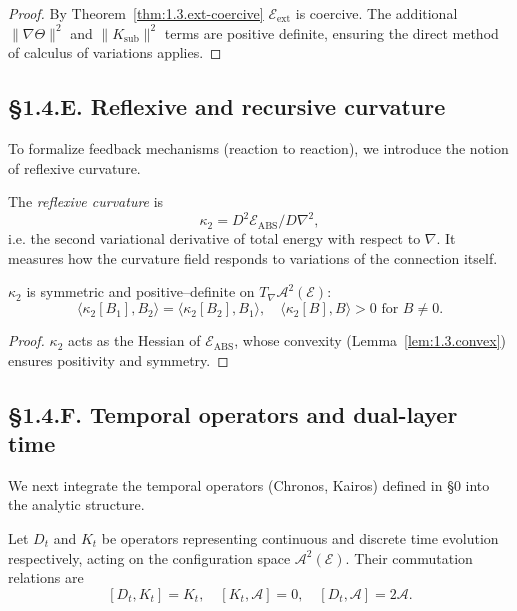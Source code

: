 \begin{proof}
By Theorem~\ref{thm:1.3.ext-coercive} $\mathcal E_{\mathrm{ext}}$ is coercive.  
The additional $\|\nabla\Theta\|^2$ and $\|K_{\mathrm{sub}}\|^2$ terms are positive definite, ensuring the direct method of calculus of variations applies.
\end{proof}

\subsection*{§1.4.E. Reflexive and recursive curvature}

To formalize feedback mechanisms (reaction to reaction), we introduce the notion of reflexive curvature.

\begin{definition}
The \emph{reflexive curvature} is
\[
\kappa_2 = D^2\mathcal E_{\mathrm{ABS}}/D\nabla^2,
\]
i.e. the second variational derivative of total energy with respect to $\nabla$.  
It measures how the curvature field responds to variations of the connection itself.
\end{definition}

\begin{lemma}\label{lem:1.4.k2sym}
$\kappa_2$ is symmetric and positive–definite on $T_\nabla\mathcal A^2(\mathcal E)$:
\[
\langle \kappa_2[B_1],B_2\rangle
=\langle \kappa_2[B_2],B_1\rangle,\quad
\langle \kappa_2[B],B\rangle>0\text{ for }B\neq0.
\]
\end{lemma}

\begin{proof}
$\kappa_2$ acts as the Hessian of $\mathcal E_{\mathrm{ABS}}$, whose convexity (Lemma~\ref{lem:1.3.convex}) ensures positivity and symmetry.
\end{proof}

\subsection*{§1.4.F. Temporal operators and dual-layer time}

We next integrate the temporal operators (Chronos, Kairos) defined in §0 into the analytic structure.

\begin{definition}
Let $D_t$ and $K_t$ be operators representing continuous and discrete time evolution respectively, acting on the configuration space $\mathcal A^2(\mathcal E)$.  
Their commutation relations are
\[
[D_t,K_t]=K_t,\quad [K_t,\mathcal A]=0,\quad [D_t,\mathcal A]=2\mathcal A.
\]
\end{definition}

